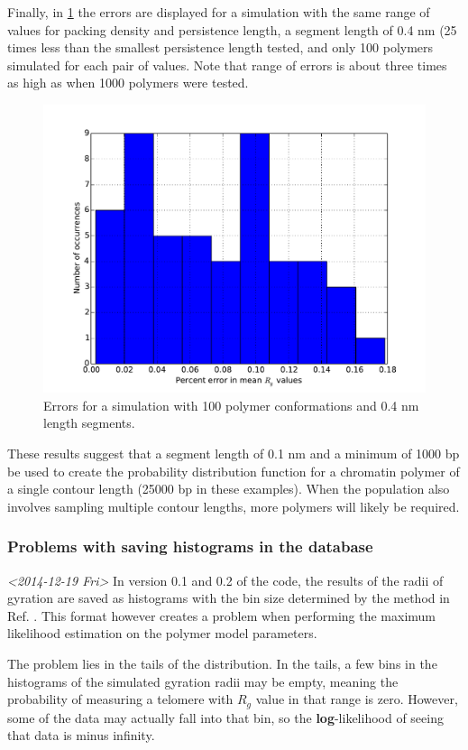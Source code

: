 \documentclass[11pt]{article}
\begin{document}
Finally, in \ref{fig-accuracy3} the errors are displayed for a
simulation with the same range of values for packing density and
persistence length, a segment length of 0.4 nm (25 times less than the
smallest persistence length tested, and only 100 polymers simulated
for each pair of values. Note that range of errors is about three
times as high as when 1000 polymers were tested.

\begin{figure}[htb]
\centering
\includegraphics[width=.9\linewidth]{./images/accuracy3.pdf}
\caption{\label{fig-accuracy3}Errors for a simulation with 100 polymer conformations and 0.4 nm length segments.}
\end{figure}

These results suggest that a segment length of 0.1 nm and a minimum of
1000 bp be used to create the probability distribution function for a
chromatin polymer of a single contour length (25000 bp in these
examples). When the population also involves sampling multiple contour
lengths, more polymers will likely be required.

\subsubsection{Problems with saving histograms in the database}
\label{sec-3-3-2}
\textit{<2014-12-19 Fri>}
In version 0.1 and 0.2 of the code, the results of the radii of
gyration are saved as histograms with the bin size determined by
the method in Ref. \cite{scott-biometrika-1979}. This format
however creates a problem when performing the maximum likelihood
estimation on the polymer model parameters.

The problem lies in the tails of the distribution. In the tails, a
few bins in the histograms of the simulated gyration radii may be
empty, meaning the probability of measuring a telomere with $R_g$
value in that range is zero. However, some of the data may
actually fall into that bin, so the \textbf{log}-likelihood of seeing
that data is minus infinity.
\end{document}
